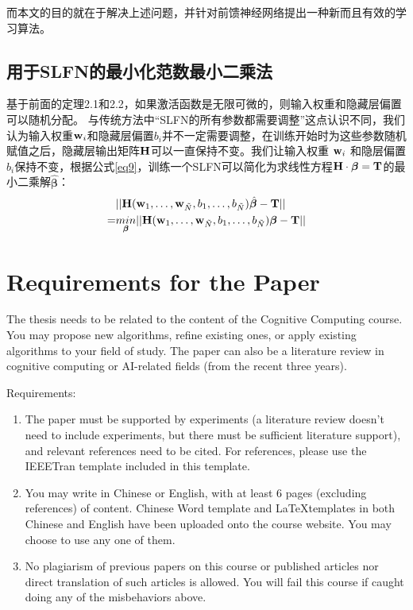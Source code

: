 \documentclass[conference]{IEEEtran}
\begin{document}
而本文的目的就在于解决上述问题，并针对前馈神经网络提出一种新而且有效的学习算法。

\subsection{用于SLFN的最小化范数最小二乘法}

基于前面的定理2.1和2.2，如果激活函数是无限可微的，则输入权重和隐藏层偏置可以随机分配。
与传统方法中“SLFN的所有参数都需要调整”这点认识不同，我们认为输入权重${\bf w}_i$和隐藏层偏置$b_i$并不一定需要调整，在训练开始时为这些参数随机赋值之后，隐藏层输出矩阵${\bf H}$可以一直保持不变。我们让输入权重 ${\bf w}_i$ 和隐层偏置$b_i$保持不变，根据公式\eqref{eq9}，训练一个SLFN可以简化为求线性方程${\bf{H}}\cdot{\bm{\beta}}={\bf{T}}$的最小二乘解$\hat{\bm{\beta}}$：
\begin{equation}\label{eq12}
	\begin{split}
		&||{\bf{H}}({\bf{w}}_1,\dots,{\bf{w}}_{\tilde{N}},b_1,\dots,b_{\tilde{N}})\hat{\bm{\beta}}-{\bf{T}}||\\
		=&\underset{\bm \beta}{min}||{\bf{H}}({\bf{w}}_1,\dots,{\bf{w}}_{\tilde{N}},b_1,\dots,b_{\tilde{N}}){\bm \beta}-{\bf{T}}||
	\end{split}
\end{equation}



\section*{Requirements for the Paper}

The thesis needs to be related to the content of the Cognitive Computing course. You may propose new algorithms, refine existing ones, or apply existing algorithms to your field of study. The paper can also be a literature review in cognitive computing or AI-related fields (from the recent three years).

Requirements:
\begin{enumerate}
	\item The paper must be supported by experiments (a literature review doesn't need to include experiments, but there must be sufficient literature support), and relevant references need to be cited. For references, please use the IEEETran template included in this template.
	\item You may write in Chinese or English, with at least 6 pages (excluding references) of content. Chinese Word template and \LaTeX templates in both Chinese and English have been uploaded onto the course website. You may choose to use any one of them.
	\item No plagiarism of previous papers on this course or published articles nor direct translation of such articles is allowed. You will fail this course if caught doing any of the misbehaviors above.
\end{enumerate}
\end{document}
